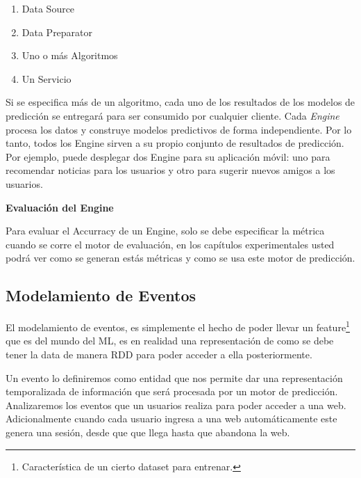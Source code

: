   \begin{enumerate}
    \item Data Source
    \item Data Preparator
    \item Uno o más Algoritmos
    \item Un Servicio
  \end{enumerate}

  Si se especifica más de un algoritmo, cada uno de los resultados de los modelos de predicción se entregará para ser consumido por cualquier cliente.
  Cada \emph{Engine} procesa los datos y construye modelos predictivos de forma independiente. Por lo tanto, todos los Engine sirven a su propio conjunto de resultados de predicción. Por ejemplo, puede desplegar dos Engine para su aplicación móvil: uno para recomendar noticias para los usuarios y otro para sugerir nuevos amigos a los usuarios.


\vspace{1cm}
\textbf{Evaluación del Engine }

  Para evaluar el Accurracy de un Engine, solo se debe especificar la métrica cuando se corre el motor de evaluación, en los capítulos experimentales usted podrá ver como se generan estás métricas y como se usa este motor de predicción.











\subsection{Modelamiento de Eventos}





  El modelamiento de eventos, es simplemente el hecho de poder llevar un feature\footnote{Característica de un cierto dataset para entrenar.}   que es del mundo del ML, es en realidad una representación de como se debe tener la data de manera RDD para poder acceder a ella posteriormente. 

  Un evento lo definiremos como entidad que nos permite dar una representación temporalizada de información que será procesada por un motor de predicción. Analizaremos los eventos que un usuarios realiza para poder acceder a una web. Adicionalmente cuando cada usuario ingresa a una web automáticamente este genera una sesión, desde que que llega hasta que abandona la web.

